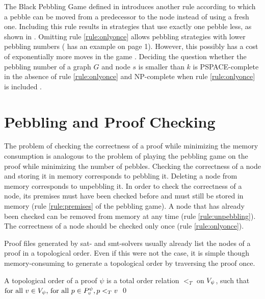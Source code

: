 \documentclass{llncs}
\begin{document}
\noindent
The Black Pebbling Game defined in \cite{hertel2007black,pippenger1982advances} introduces another rule according to which a pebble can be moved from a predecessor to the node instead of using a fresh one.
Including this rule results in strategies that use exactly one pebble less, as shown in \cite{van1979move}.
Omitting rule \ref{rule:onlyonce} allows pebbling strategies with lower pebbling numbers (\cite{sethi1975complete} has an example on page 1).
However, this possibly has a cost of exponentially more moves in the game \cite{van1979move}.
Deciding the question whether the pebbling number of a graph $G$ and node $s$ is smaller than $k$ is PSPACE-complete in the absence of rule \ref{rule:onlyonce} \cite{gilbert1980pebbling} and NP-complete when rule \ref{rule:onlyonce} is included \cite{sethi1975complete}.



\section{Pebbling and Proof Checking}
\label{sec:pebblingchecking}

The problem of checking the correctness of a proof while minimizing the memory consumption is analogous to the problem of playing the pebbling game on the proof while minimizing the number of pebbles. Checking the correctness of a node and storing it in memory corresponds to pebbling it. Deleting a node from memory corresponds to unpebbling it. In order to check the correctness of a node, its premises must have been checked before and must still be stored in memory (rule \ref{rule:premises} of the pebbling game). A node that has already been checked can be removed from memory at any time (rule \ref{rule:unpebbling}). The correctness of a node should be checked only once (rule \ref{rule:onlyonce}).

Proof files generated by sat- and smt-solvers usually already list the nodes of a proof in a topological order. Even if this were not the case, it is simple though memory-consuming to generate a topological order by traversing the proof once.

\begin{definition}
\label{def:topological-order}
A topological order of a proof $\psi$ is a total order relation $<_T$ on $V_{\psi}$, such that 
$
\text{for all } v \in V_{\psi} \text{, for all } p \in P_{v}^{\psi},
p <_T v
$
\qed
\end{definition}
\end{document}
